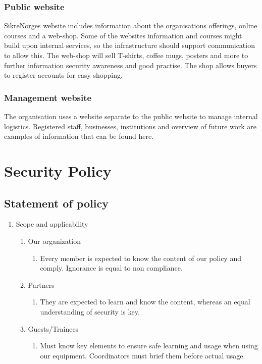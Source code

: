\subsubsection{Public website}

SikreNorges website includes information about the organisations offerings, online courses and a web-shop. Some of the websites information and courses might build upon internal services, so the infrastructure should support communication to allow this. The web-shop will sell T-shirts, coffee mugs, posters and more to further information security awareness and good practise. The shop allows buyers to register accounts for easy shopping.

\subsubsection{Management website}

The organisation uses a website separate to the public website to manage internal logistics. Registered staff, businesses, institutions and overview of future work are examples of information that can be found here.


\section{Security Policy}


\subsection{Statement of policy}

\begin{enumerate}
  \item Scope and applicability
  \begin{enumerate}
    \item Our organization
      \begin{enumerate}
        \item Every member is expected to know the content of our policy and comply. Ignorance is equal to non compliance.
      \end{enumerate}
        \item Partners
      \begin{enumerate}
        \item They are expected to learn and know the content, whereas an equal understanding of security is key.
      \end{enumerate}
        \item Guests/Trainees
      \begin{enumerate}
        \item Must know key elements to ensure safe learning and usage when using our equipment. Coordinators must brief them before actual usage.
      \end{enumerate}
  \end{enumerate}
\end{enumerate}

